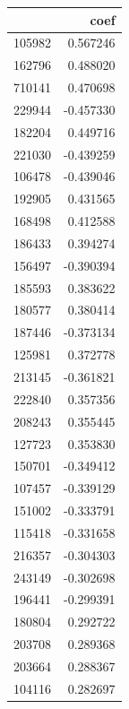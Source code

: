\documentclass[twocolumn]{article}
\begin{document}
\begin{table}[h!]
    \begin{tabular}{lr}
    \toprule
     & coef \\
    \midrule
    105982 & 0.567246 \\
    162796 & 0.488020 \\
    710141 & 0.470698 \\
    229944 & -0.457330 \\
    182204 & 0.449716 \\
    221030 & -0.439259 \\
    106478 & -0.439046 \\
    192905 & 0.431565 \\
    168498 & 0.412588 \\
    186433 & 0.394274 \\
    156497 & -0.390394 \\
    185593 & 0.383622 \\
    180577 & 0.380414 \\
    187446 & -0.373134 \\
    125981 & 0.372778 \\
    213145 & -0.361821 \\
    222840 & 0.357356 \\
    208243 & 0.355445 \\
    127723 & 0.353830 \\
    150701 & -0.349412 \\
    107457 & -0.339129 \\
    151002 & -0.333791 \\
    115418 & -0.331658 \\
    216357 & -0.304303 \\
    243149 & -0.302698 \\
    196441 & -0.299391 \\
    180804 & 0.292722 \\
    203708 & 0.289368 \\
    203664 & 0.288367 \\
    104116 & 0.282697 \\
    \bottomrule
    \end{tabular}
\end{table}
\end{document}
